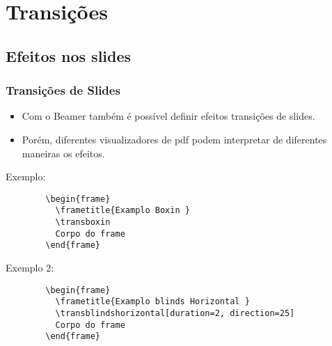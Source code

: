 \section{Transições}
\subsection{Efeitos nos slides}

\begin{frame}[fragile]
  \frametitle{Transições de Slides}

  \begin{itemize}
     \item Com o Beamer também é possível definir efeitos transições de slides.
     \item Porém, diferentes visualizadores de pdf podem interpretar de diferentes maneiras os efeitos.
  \end{itemize}

  \begin{block}{Exemplo:}
    \begin{verbatim}
        \begin{frame}
          \frametitle{Examplo Boxin }
          \transboxin
          Corpo do frame
        \end{frame}
    \end{verbatim}
  \end{block}

\end{frame}

\begin{frame}[fragile]
  \transboxin

  \begin{block}{Exemplo 2:}
    \begin{verbatim}
        \begin{frame}
          \frametitle{Examplo blinds Horizontal }
          \transblindshorizontal[duration=2, direction=25]
          Corpo do frame
        \end{frame}
    \end{verbatim}
  \end{block}
\end{frame}


